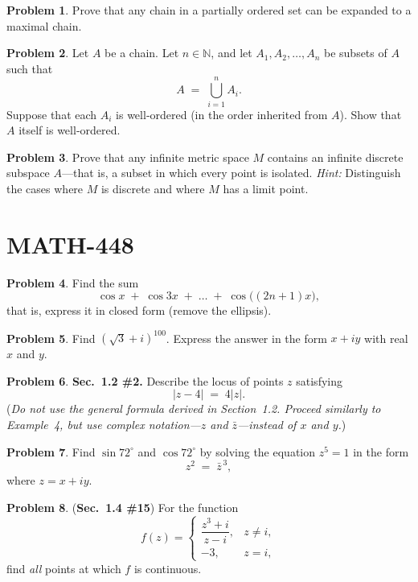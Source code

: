 \documentclass[10pt]{article}
\theoremstyle{definition} %
\newtheorem{problem}{Problem}
\theoremstyle{plain} %
\begin{document}
\begin{problem}
  Prove that any chain in a partially ordered set can be expanded to a maximal chain.
\end{problem}

\begin{problem}
  Let $A$ be a chain.  Let $n \in \mathbb{N}$, and let $A_{1},A_{2},\dots,A_{n}$ be subsets of $A$ such that
  \[
      A \;=\; \bigcup_{i=1}^{n} A_{i}.
  \]
  Suppose that each $A_{i}$ is well‑ordered (in the order inherited from $A$).  
  Show that $A$ itself is well‑ordered.
\end{problem}

\begin{problem}
  Prove that any infinite metric space $M$ contains an infinite discrete subspace $A$—that is, a subset in which every point is isolated.  
  \textit{Hint:} Distinguish the cases where $M$ is discrete and where $M$ has a limit point.
\end{problem}
\pagebreak
  \section{MATH-448}
  \begin{problem}
    Find the sum
    \[
        \cos x \;+\; \cos 3x \;+\; \dots \;+\; \cos\bigl((2n+1)x\bigr),
    \]
    that is, express it in closed form (remove the ellipsis).
\end{problem}

\begin{problem}
    Find $(\sqrt{3}+i)^{100}$.  
    Express the answer in the form $x + iy$ with real $x$ and $y$.
\end{problem}

\begin{problem}
    \textbf{Sec.\ 1.2 \#2.}  
    Describe the locus of points $z$ satisfying
    \[
        \lvert z-4\rvert \;=\; 4\lvert z\rvert.
    \]
    (\emph{Do not use the general formula derived in Section 1.2.  
    Proceed similarly to Example 4, but use complex notation—$z$ and $\bar z$—instead of $x$ and $y$.})
\end{problem}

\begin{problem}
    Find $\sin 72^{\circ}$ and $\cos 72^{\circ}$ by solving the equation $z^{5}=1$ in the form
    \[
        z^{2} \;=\; \bar z^{\,3},
    \]
    where $z = x + iy$.
\end{problem}
\begin{problem}
  (\textbf{Sec.\ 1.4 \#15})  
  For the function
  \[
      f(z)=
      \begin{cases}
          \dfrac{z^{3}+i}{\,z-i\,}, & z \neq i,\\[6pt]
          -3, & z = i,
      \end{cases}
  \]
  find \emph{all} points at which \(f\) is continuous.
\end{problem}
\end{document}
